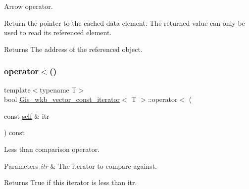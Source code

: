 Arrow operator. 

Return the pointer to the cached data element. The returned value can only be used to read its referenced element. \begin{DoxyReturn}{Returns}
The address of the referenced object. 
\end{DoxyReturn}
\mbox{\label{classGis__wkb__vector__const__iterator_acd1883594b6d922e5d7e377fc3e9e37c}} 
\subsubsection{\texorpdfstring{operator$<$()}{operator<()}}
{\footnotesize\ttfamily template$<$typename T$>$ \\
bool \mbox{\hyperlink{classGis__wkb__vector__const__iterator}{Gis\+\_\+wkb\+\_\+vector\+\_\+const\+\_\+iterator}}$<$ T $>$\+::operator$<$ (\begin{DoxyParamCaption}\item[{const \mbox{\hyperlink{classGis__wkb__vector__const__iterator}{self}} \&}]{itr }\end{DoxyParamCaption}) const\hspace{0.3cm}{\ttfamily [inline]}}



Less than comparison operator. 


\begin{DoxyParams}{Parameters}
{\em itr} & The iterator to compare against. \\
\hline
\end{DoxyParams}
\begin{DoxyReturn}{Returns}
True if this iterator is less than itr. 
\end{DoxyReturn}
\mbox{\label{classGis__wkb__vector__const__iterator_ab15c5c1661dc666382fdbe8cda4486f9}} 
